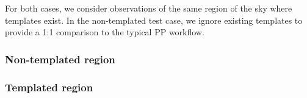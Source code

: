 For both cases, we consider observations of the same region of the sky where templates exist. In the non-templated test case, we ignore existing templates to provide a 1:1 comparison to the typical PP workflow.

\subsubsection{Non-templated region}\label{subsubsec:systemTests NonTemplated}


\subsubsection{Templated region}\label{subsubsec:systemTests templated}

